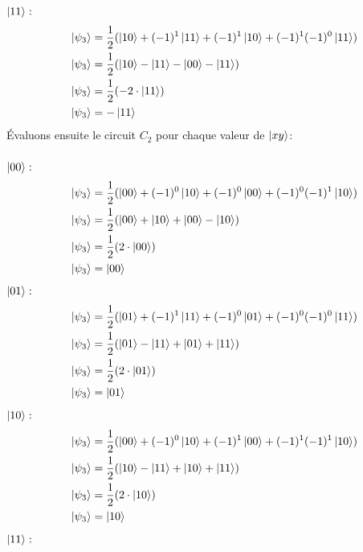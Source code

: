 \documentclass{article}
\begin{document}
$\ket{11}:$ \\
\begin{align*}
&&      \ket{\psi_3} &= \frac{1}{2}(\ket{10} + (-1)^1\ket{11} + (-1)^1\ket{10} + (-1)^1(-1)^{0} \ket{11}) \\
&&      \ket{\psi_3} &= \frac{1}{2}(\ket{10} - \ket{11} - \ket{00} - \ket{11}) \\
&&      \ket{\psi_3} &= \frac{1}{2}(-2 \cdot \ket{11}) \\
&&      \ket{\psi_3} &= -\ket{11} \\
\end{align*}
Évaluons ensuite le circuit $C_2$ pour chaque valeur de $\ket{xy}$: \\ \\
$\ket{00}:$ \\
\begin{align*}
&&      \ket{\psi_3} &= \frac{1}{2}(\ket{00} + (-1)^0\ket{10} + (-1)^0\ket{00} + (-1)^0(-1)^1\ket{10}) \\
&&      \ket{\psi_3} &= \frac{1}{2}(\ket{00} + \ket{10} + \ket{00} - \ket{10}) \\
&&      \ket{\psi_3} &= \frac{1}{2}(2 \cdot \ket{00}) \\
&&      \ket{\psi_3} &= \ket{00} \\
\end{align*}
$\ket{01}:$ \\
\begin{align*}
&&      \ket{\psi_3} &= \frac{1}{2}(\ket{01} + (-1)^1\ket{11} + (-1)^0\ket{01} + (-1)^0(-1)^0\ket{11}) \\
&&      \ket{\psi_3} &= \frac{1}{2}(\ket{01} - \ket{11} + \ket{01} + \ket{11}) \\
&&      \ket{\psi_3} &= \frac{1}{2}(2 \cdot \ket{01}) \\
&&      \ket{\psi_3} &= \ket{01} \\
\end{align*}
$\ket{10}:$ \\
\begin{align*}
&&      \ket{\psi_3} &= \frac{1}{2}(\ket{00} + (-1)^0\ket{10} + (-1)^1\ket{00} + (-1)^1(-1)^1\ket{10}) \\
&&      \ket{\psi_3} &= \frac{1}{2}(\ket{10} - \ket{11} + \ket{10} + \ket{11}) \\
&&      \ket{\psi_3} &= \frac{1}{2}(2 \cdot \ket{10}) \\
&&      \ket{\psi_3} &= \ket{10} \\
\end{align*}
$\ket{11}:$ \\
\end{document}
